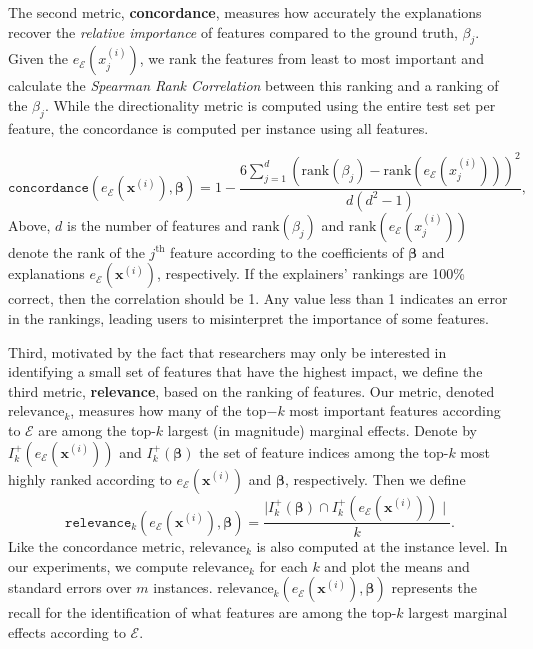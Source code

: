 \documentclass[mnsc,blindrev]{informs3}
\newcommand{\mE}{\mathcal{E}}
\begin{document}
      The second metric, \textbf{concordance}, measures how accurately the explanations recover the \textit{relative importance} of features compared to the ground truth, $\beta_j$. Given the $e_\mathcal{E}(x^{(i)}_j)$, we rank the features from least to most important and calculate the \emph{Spearman Rank Correlation} \cite{spearman1904proof} between this ranking and a ranking of the $\beta_j$. While the directionality metric is computed using the entire test set per feature, the concordance is computed per instance using all features.

    \begin{equation}
       \texttt{concordance}(e_\mE(\mathbf{x}^{(i)}),\boldsymbol{\beta}) = 1 - \frac{6\sum_{j=1}^d (\text{rank}(\beta_j) - \text{rank}(e_\mE(x^{(i)}_j)))^2}{d(d^2-1)},
    \end{equation}
    Above, $d$ is the number of features and $\text{rank}(\beta_j)$ and $\text{rank}(e_\mE(x^{(i)}_j))$ denote the rank of the $j^{\text{th}}$ feature according to the coefficients of $\boldsymbol{\beta}$ and explanations $e_\mE(\mathbf{x}^{(i)})$, respectively. If the explainers' rankings are 100\% correct, then the correlation should be 1. Any value less than 1 indicates an error in the rankings, leading users to misinterpret the importance of some features.
    
Third, motivated by the fact that  researchers may only be  interested in identifying a small set of features that have the highest impact, we define the third metric, \textbf{relevance}, based on the ranking of features. Our metric, denoted $\text{relevance}_k$, measures how many of the top$-k$ most important features according to $\mathcal{E}$  are among the top-$k$ largest (in magnitude) marginal effects. Denote by $I_k^+(e_\mE(\mathbf{x}^{(i)}))$ and $I_k^+(\boldsymbol{\beta})$  the set of feature indices among the top-$k$ most highly ranked according to $e_\mE(\mathbf{x}^{(i)})$ and $\boldsymbol{\beta}$, respectively. Then we define 
    \begin{equation}
        \texttt{relevance}_k(e_\mE(\mathbf{x}^{(i)}), \boldsymbol{\beta}) = \frac{\mid I_k^+(\boldsymbol{\beta}) \cap I_k^+(e_\mE(\mathbf{x}^{(i)}))\mid}{k}.
    \end{equation}
     Like the concordance metric, $\text{relevance}_k$ is also computed at the instance level. 
    In our experiments, we compute $\text{relevance}_k$ for each $k$ and plot the means and standard errors over $m$ instances. $\text{relevance}_k(e_\mE(\mathbf{x}^{(i)}), \boldsymbol{\beta})$ represents the recall for the identification of what features are among the top-$k$ largest marginal effects according to $\mathcal{E}$.       
    
\end{document}
